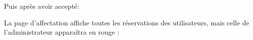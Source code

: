 \documentclass{article}
\begin{document}
\begin{enumerate}
               \noindent{}  
  
  \vspace{2cm}
  Puis après avoir accepté:
  
  \vspace{0.7cm}
               \hspace*{-0.7in}

               \noindent{}
  
  
  La page d'affectation affiche toutes les réservations des utilisateurs, mais celle de l'administrateur apparaîtra en rouge :
  
  \vspace{0.7cm}
               \hspace*{-0.7in}
               \noindent{}
               

\end{enumerate}
\end{document}
